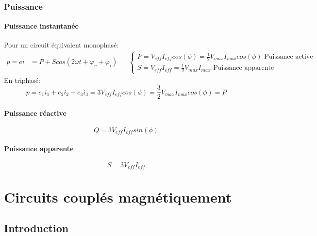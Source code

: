 \documentclass{report}
\begin{document}
\subsection{Puissance}
\subsubsection{Puissance instantanée}
Pour un circuit équivalent monophasé:
\begin{align*}
p = ei &= P + S cos(2 \omega t + \varphi_v + \varphi_i) & &\begin{cases}
P = V_{eff}I_{eff} cos(\phi) = \frac{1}{2} V_{max} I_{max} cos(\phi) \text{     Puissance active}\\
S = V_{eff}I_{eff} = \frac{1}{2} V_{max} I_{max} \text{      Puissance apparente}
\end{cases}
\end{align*}
En triphasé:
\begin{equation}
p = e_1 i_1 + e_2 i_2 + e_3 i_3 = 3 V_{eff} I_{eff} cos(\phi) = \frac{3}{2} V_{max} I_{max} cos(\phi) = P
\end{equation}

\subsubsection{Puissance réactive}
\begin{equation}
Q = 3 V_{eff} I_{eff} sin(\phi)
\end{equation}

\subsubsection{Puissance apparente}
\begin{equation}
S = 3 V_{eff} I_{eff}
\end{equation}

\chapter{Circuits couplés magnétiquement}
\section{Introduction}
\end{document}
